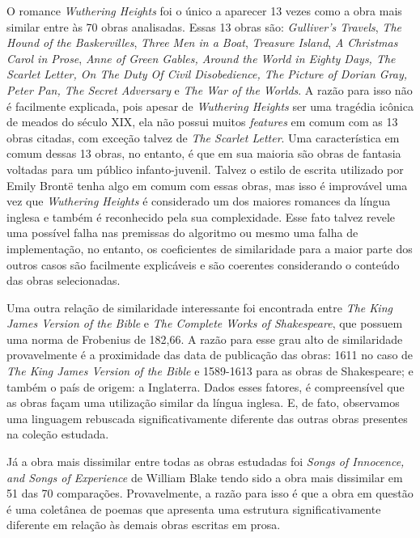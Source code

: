 \documentclass{article}
\begin{document}
O romance \textit{Wuthering Heights} foi o único a aparecer 13 vezes como a obra mais similar entre às 70 obras 
analisadas. Essas 13 obras são: \textit{Gulliver’s Travels}, \textit{The Hound of the Baskervilles}, \textit{Three Men in a Boat},
\textit{Treasure Island}, \textit{A Christmas Carol in Prose}, \textit{Anne of Green Gables,
Around the World in Eighty Days, The Scarlet Letter, On The Duty Of Civil Disobedience,
The Picture of Dorian Gray, Peter Pan, The Secret Adversary} e \textit{The War of the Worlds}. A razão para isso
não é facilmente explicada, pois apesar de \textit{Wuthering Heights} ser uma tragédia icônica de meados do
século XIX, ela não possui muitos \textit{features} em comum com as 13 obras citadas, com exceção
talvez de \textit{The Scarlet Letter}. Uma característica em comum dessas 13 obras, no entanto, é que em sua maioria
são obras de fantasia voltadas para um público infanto-juvenil. Talvez o estilo de escrita
utilizado por Emily Brontë tenha algo em comum com essas obras, mas isso é improvável
uma vez que \textit{Wuthering Heights} é considerado um dos maiores romances da língua inglesa e também é reconhecido
pela sua complexidade. Esse fato talvez revele uma possível falha nas premissas do algoritmo ou mesmo uma
falha de implementação, no entanto, os coeficientes de similaridade para a maior parte dos outros casos
são facilmente explicáveis e são coerentes considerando o conteúdo das obras selecionadas.

Uma outra relação de similaridade interessante foi encontrada entre \textit{The King James Version of the Bible} e
\textit{The Complete Works of Shakespeare}, que possuem uma norma de Frobenius de 182,66. A razão para esse grau alto 
de similaridade provavelmente é a proximidade das data de publicação das obras: 1611 no caso de \textit{The King 
James Version of the Bible} e 1589-1613 para as obras de Shakespeare; e também o país de origem: a Inglaterra. 
Dados esses fatores, é compreensível que as obras façam uma utilização similar da língua inglesa. E, de fato,
observamos uma linguagem rebuscada significativamente diferente das outras obras presentes na coleção estudada.

Já a obra mais dissimilar entre todas as obras estudadas foi \textit{Songs of Innocence, and Songs of Experience}
de William Blake tendo sido a obra mais dissimilar em 51 das 70 comparações. Provavelmente, a razão para isso é
que a obra em questão é uma coletânea de poemas que apresenta uma estrutura significativamente diferente em 
relação às demais obras escritas em prosa. 
\end{document}
